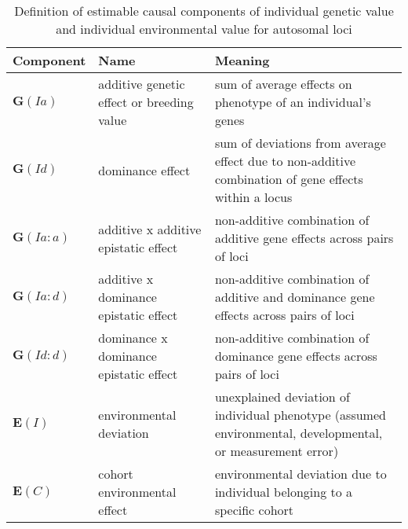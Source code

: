 \begin{table}
\centering
\caption{Definition of estimable causal components of individual genetic value and individual environmental value for autosomal loci}
\label{tab.indiv}
\vspace{0.1in}
\begin{tabular}{l|p{1.2in}|p{2.4in}}
Component & Name & Meaning \\ \hline
${\bm G(Ia)}$     & additive genetic effect or breeding value &  sum of average effects on phenotype of an individual's genes \\
${\bm G(Id)}$     & dominance effect  & sum of deviations from average effect due to non-additive combination of gene effects within a locus \\
${\bm G(Ia:a)}$   & additive x additive epistatic effect & non-additive combination of additive gene effects across pairs of loci \\
${\bm G(Ia:d)}$   & additive x dominance epistatic effect & non-additive combination of additive and dominance gene effects across pairs of loci \\
${\bm G(Id:d)}$   & dominance x dominance epistatic effect & non-additive combination of dominance gene effects across pairs of loci\\ \hline
${\bm E(I)}$      & environmental deviation & unexplained deviation of individual phenotype (assumed environmental, developmental, or measurement error) \\
${\bm E(C)}$      & cohort environmental effect & environmental deviation due to individual belonging to a specific cohort \\ \hline
\end{tabular}
\end{table}
